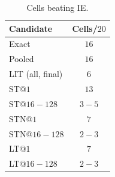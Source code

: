 \begin{table}
  \vspace{-0.6em}
  \caption{Cells beating IE.}
  \label{tab:per-llm-consistency}
  \centering
  \footnotesize
  \setlength{\tabcolsep}{3pt}
  \renewcommand{\arraystretch}{1.05}
  \begin{tabular}{@{}l c@{}}
    \toprule
    \textbf{Candidate} & \textbf{Cells/$20$} \\
    \midrule
    Exact                & \cellcolor{c4high}$16$ \\
    Pooled               & \cellcolor{c4high}$16$ \\
    LIT (all, final)     & \cellcolor{c4low}$6$ \\
    \midrule
    ST@$1$               & $13$ \\
    ST@$16{-}128$        & \cellcolor{c4low}$3{-}5$ \\
    STN@$1$              & $7$ \\
    STN@$16{-}128$       & \cellcolor{c4low}$2{-}3$ \\
    LT@$1$               & $7$ \\
    LT@$16{-}128$        & \cellcolor{c4low}$2{-}3$ \\
    \bottomrule
  \end{tabular}
  \vspace{-0.6em}
\end{table}
